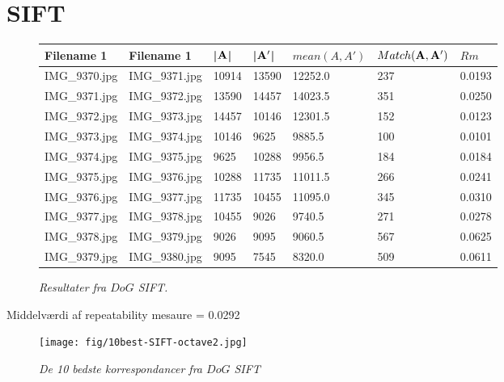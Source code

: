 \section{SIFT}
\begin{figure}[H]
    \centering
    \begin{center}    
    \begin{tabular}{ | l | l | l | l | l | l | l |}
    \hline
    Filename 1 & Filename 1 & |$\bold{A}$| & |$\bold{A'}$| & $mean(A,A')$ & $Match(\bold{A}, \bold{A}')$ & $Rm$ \\ \hline
IMG\_9370.jpg &	IMG\_9371.jpg &	10914 &	13590 &	12252.0 &	237 &	0.0193\\ \hline
IMG\_9371.jpg &	IMG\_9372.jpg &	13590 &	14457 &	14023.5 &	351 &	0.0250\\ \hline
IMG\_9372.jpg &	IMG\_9373.jpg &	14457 &	10146 &	12301.5 &	152 &	0.0123\\ \hline
IMG\_9373.jpg &	IMG\_9374.jpg &	10146 &	9625 &	9885.5 &	100 &	0.0101\\ \hline
IMG\_9374.jpg &	IMG\_9375.jpg &	9625 &	10288 &	9956.5 &	184 &	0.0184\\ \hline
IMG\_9375.jpg &	IMG\_9376.jpg &	10288 &	11735 &	11011.5 &	266 &	0.0241\\ \hline
IMG\_9376.jpg &	IMG\_9377.jpg &	11735 &	10455 &	11095.0 &	345 &	0.0310\\ \hline
IMG\_9377.jpg &	IMG\_9378.jpg &	10455 &	9026 &	9740.5 &	271 &	0.0278\\ \hline
IMG\_9378.jpg &	IMG\_9379.jpg &	9026 &	9095 &	9060.5 &	567 &	0.0625\\ \hline
IMG\_9379.jpg &	IMG\_9380.jpg &	9095 &	7545 &	8320.0 &	509 &	0.0611\\ \hline
    \end{tabular}       
    \caption{{\footnotesize \textit{Resultater fra $DoG$ SIFT.}}}
    \label{tab:SURFOCTAVE2}
     \end{center}
     \vspace{-2.5em}
\end{figure} \noindent
Middelværdi af repeatability mesaure = 0.0292
\begin{figure}[H]
    \centering
    \texttt{[image: fig/10best-SIFT-octave2.jpg]}
    \vspace{-0.5em}   
    \begin{center}
    \caption{{\footnotesize \textit{
    De 10 bedste korrespondancer fra $DoG$ SIFT}}}
    \label{fig:sifsif}
     \end{center}
  \end{figure}
       \vspace{-2.7em}
\noindent

